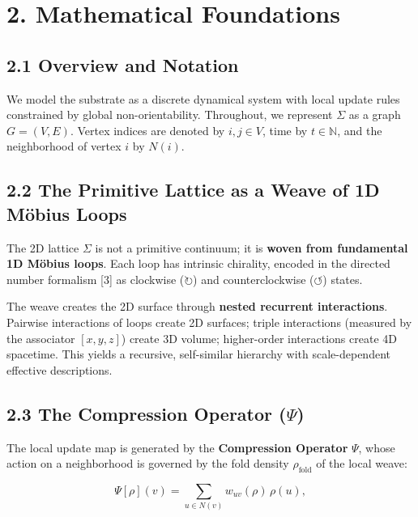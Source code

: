 \documentclass[
  11pt,
]{article}
\begin{document}
\section{2. Mathematical Foundations}\label{mathematical-foundations}

\subsection{2.1 Overview and Notation}\label{overview-and-notation}

We model the substrate as a discrete dynamical system with local update
rules constrained by global non-orientability. Throughout, we represent
\(\Sigma\) as a graph \(G = (V, E)\). Vertex indices are denoted by
\(i, j \in V\), time by \(t \in \mathbb{N}\), and the neighborhood of
vertex \(i\) by \(N(i)\).

\subsection{2.2 The Primitive Lattice as a Weave of 1D Möbius
Loops}\label{the-primitive-lattice-as-a-weave-of-1d-muxf6bius-loops}

The 2D lattice \(\Sigma\) is not a primitive continuum; it is
\textbf{woven from fundamental 1D Möbius loops}. Each loop has intrinsic
chirality, encoded in the directed number formalism {[}3{]} as clockwise
(\(\circlearrowright\)) and counterclockwise (\(\circlearrowleft\))
states.

The weave creates the 2D surface through \textbf{nested recurrent
interactions}. Pairwise interactions of loops create 2D surfaces; triple
interactions (measured by the associator \([x, y, z]\)) create 3D
volume; higher-order interactions create 4D spacetime. This yields a
recursive, self-similar hierarchy with scale-dependent effective
descriptions.

\subsection{\texorpdfstring{2.3 The Compression Operator
(\(\Psi\))}{2.3 The Compression Operator (\textbackslash Psi)}}\label{the-compression-operator-psi}

The local update map is generated by the \textbf{Compression Operator}
\(\Psi\), whose action on a neighborhood is governed by the fold density
\(\rho_{\text{fold}}\) of the local weave:

\[\Psi[\rho](v) = \sum_{u \in N(v)} w_{uv}(\rho)\, \rho(u),\]
\end{document}
